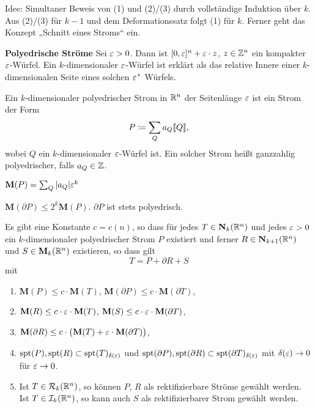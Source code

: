 \documentclass[a4paper,twoside,DIV15,BCOR12mm]{scrbook}
\newcommand{\MN}{\mathbf M}
\newcommand{\NS}{\mathbf N}
\DeclareMathOperator{\spt}{spt}
\begin{document}
\begin{beweis}
Idee: Simultaner Beweis von (1) und (2)/(3) durch vollständige Induktion über $k$. Aus (2)/(3) für $k-1$ und dem  Deformationssatz folgt (1) für $k$. Ferner geht das Konzept „Schnitt eines Stroms“ ein.
\end{beweis}

\textbf{Polyedrische Ströme} Sei $\varepsilon>0$. Dann ist $[0,\varepsilon]^n + \varepsilon \cdot z$, $z\in\mathbb{Z}^n$ ein kompakter $\varepsilon$-Würfel. Ein $k$-dimensionaler $\varepsilon$-Würfel ist erklärt als das relative Innere einer $k$-dimensionalen  Seite eines solchen $\varepsilon$"~Würfels.

\begin{definition}
Ein $k$-dimensionaler polyedrischer Strom in $\mathbb{R}^n$ der Seitenlänge $\varepsilon$ ist ein Strom der Form
\[
P \da \sum_Q a_Q \llbracket Q\rrbracket,
\]
wobei $Q$ ein $k$-dimensionaler $\varepsilon$-Würfel ist. Ein solcher Strom heißt ganzzahlig polyedrischer, falls $a_Q\in \mathbb{Z}$.
\end{definition}

\begin{bemerkungen}
\item $\MN(P) = \sum_Q |a_Q| \ep ^k$
\item $\MN(\partial P) \le 2^k \MN(P)$. $\partial P$ ist stets polyedrisch.
\end{bemerkungen}

\begin{satz}[Deformationssatz]
Es gibt eine Konstante $c= c(n)$, so dass für jedes $T\in \NS_k(\MdR^n)$ und jedes $\varepsilon >0$ ein $k$-dimensionaler polyedrischer Strom $P$ existiert und ferner $R\in \NS_{k+1}(\MdR^n)$ und $S\in \MN_k(\MdR^n)$ existieren, so dass gilt
\[
T = P + \partial R + S
\]
mit
\begin{enumerate}
\item $\MN(P) \le c\cdot \MN(T)$, $\MN(\partial P) \le c\cdot \MN(\partial T)$,
\item $\MN(R) \le c\cdot \ep \cdot \MN(T)$, $\MN(S) \le c \cdot \ep \cdot \MN(\partial T)$,
\item $\MN(\partial R) \le c \cdot \big( \MN(T) + \ep \cdot \MN(\partial T)\big)$,
\item $\spt(P), \spt(R) \subset \spt(T)_{\delta(\ep)}$  und $\spt(\partial P), \spt(\partial R) \subset \spt(\partial T)_{\delta(\ep)}$ mit $\delta(\varepsilon)\to 0$ für $\varepsilon \to 0$.
\item Ist $T\in \mathcal R_k(\mathbb{R}^n)$, so können $P$, $R$ als rektifizierbare Ströme gewählt werden. Ist $T\in\mathcal I_k(\mathbb{R}^n)$, so kann auch $S$ als rektifizierbarer Strom gewählt werden.
\end{enumerate}
\end{satz}
\end{document}
